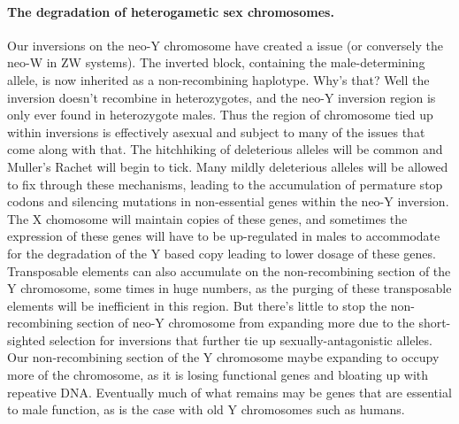 \paragraph{The degradation of heterogametic sex chromosomes.} 
Our inversions on the neo-Y chromosome have created a issue (or conversely the neo-W in ZW systems). The inverted block, containing the male-determining allele, is now inherited as a non-recombining haplotype. Why's that?  Well the inversion doesn't recombine in heterozygotes, and the neo-Y inversion region is only ever found in heterozygote males. Thus the region of chromosome tied up within inversions is effectively asexual and subject to many of the issues that come along with that. The hitchhiking of deleterious alleles will be common and Muller's Rachet will begin to tick. Many mildly deleterious alleles will be allowed to fix through these mechanisms, leading to the accumulation of permature stop codons and silencing mutations in non-essential genes within the neo-Y inversion. The X chomosome will maintain copies of these genes, and sometimes the expression of these genes will have to be up-regulated in males to accommodate for the degradation of the Y based copy leading to lower dosage of these genes.  Transposable elements can also accumulate on the non-recombining section of the Y chromosome, some times in huge numbers, as the purging of these transposable elements will be inefficient in this region.  But there's little to stop the non-recombining section of neo-Y chromosome from expanding more due to the short-sighted selection for inversions that further tie up sexually-antagonistic alleles. Our non-recombining section of the Y chromosome maybe expanding to occupy more of the chromosome, as it is losing functional genes and bloating up with repeative DNA. Eventually much of what remains may be genes that are essential to male function, as is the case with old Y chromosomes such as humans. 

 

